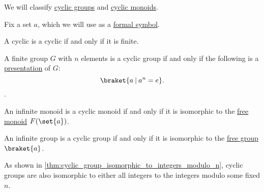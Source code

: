 \begin{proposition}\label{thm:cyclic_monoid_classification}
  We will classify \hyperref[def:cyclic_group]{cyclic groups} and \hyperref[def:cyclic_monoid]{cyclic monoids}.

  Fix a set \( a \), which we will use as a \hyperref[def:formal_language/symbol]{formal symbol}.

  \begin{thmenum}
     A cyclic  is a cyclic  if and only if it is finite.

     A finite group \( G \) with \( n \) elements is a cyclic group if and only if the following is a \hyperref[def:group_presentation]{presentation} of \( G \):
    \begin{equation}\label{eq:thm:cyclic_monoid_classification/finite_group}
      \braket{ a \given a^n = e }.
    \end{equation}.

     An infinite monoid is a cyclic monoid if and only if it is isomorphic to the \hyperref[def:free_monoid]{free monoid} \( F(\set{ a }) \).

     An infinite group is a cyclic group if and only if it is isomorphic to the \hyperref[def:free_group]{free group} \( \braket{ a } \).
  \end{thmenum}
\end{proposition}
\begin{comments}
  \item As shown in \cref{thm:cyclic_group_isomorphic_to_integers_modulo_n}, cyclic groups are also isomorphic to either all integers to the integers modulo some fixed \( n \).
\end{comments}
